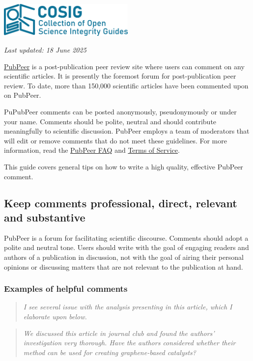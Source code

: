 \documentclass[letterpaper, 12pt]{article}
\begin{document}
\flushleft\includegraphics[width=0.5\textwidth]{img/home/241017_final_logo_mockup.png}

\textit{Last updated: 18 June 2025}

\href{https://pubpeer.com/}{PubPeer} is a post-publication peer review site where users can comment on any scientific articles. It is presently the foremost forum for post-publication peer review. To date, more than 150,000 scientific articles have been commented upon on PubPeer.

PuPubPeer comments can be posted anonymously, pseudonymously or under your name. Comments should be polite, neutral and should contribute meaningfully to scientific discussion. PubPeer employs a team of moderators that will edit or remove comments that do not meet these guidelines. For more information, read the \href{https://pubpeer.com/static/faq}{PubPeer FAQ} and \href{https://pubpeer.com/static/tos}{Terms of Service}.

This guide covers general tips on how to write a high quality, effective PubPeer comment.

\subsection*{Keep comments professional, direct, relevant and substantive}

PubPeer is a forum for facilitating scientific discourse. Comments should adopt a polite and neutral tone. Users should write with the goal of engaging readers and authors of a publication in discussion, not with the goal of airing their personal opinions or discussing matters that are not relevant to the publication at hand.

\subsubsection*{Examples of helpful comments}

\begin{quote}
    \textit{I see several issue with the analysis presenting in this article, which I elaborate upon below.}
\end{quote}

\begin{quote}
    \textit{We discussed this article in journal club and found the authors' investigation very thorough. Have the authors considered whether their method can be used for creating graphene-based catalysts?}
\end{quote}
\end{document}
